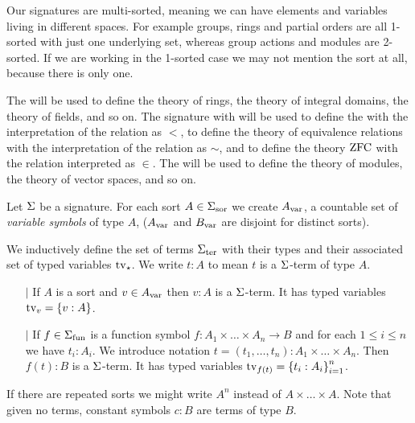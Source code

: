     Our signatures are multi-sorted, meaning we can have elements and 
    variables living in different spaces. 
    For example groups, rings and partial orders are all 1-sorted with just one
    underlying set, whereas group actions and modules are 2-sorted.
    If we are working in the 1-sorted case we may not mention the sort at all,
    because there is only one.
    
\begin{eg}
    The  
    will be used to define the theory of rings, 
    the theory of integral domains, the theory of fields, and so on.
    The signature with 
    will be used to define the 
    with the interpretation of the relation as $<$, 
    to define the theory of equivalence relations with the 
    interpretation of the relation as $\sim$,
    and to define the theory $\operatorname{ZFC}$ with the relation interpreted as $\in$.
    The  %
    will be used to define the theory of modules,
    the theory of vector spaces, and so on.
\end{eg}

\begin{dfn}[$\Si$-terms]
    Let $\Si$ be a signature. 
    For each sort $A \in {\Sigma}_\mathrm{sor}$ we create 
    ${A}_\mathrm{var}$, a countable set of \textit{variable symbols} of type $A$, 
    (${A}_\mathrm{var}$ and ${B}_\mathrm{var}$ are disjoint for distinct sorts).
    
    We inductively define the set of terms
    ${\Sigma}_\mathrm{ter}$ with their types and their 
    associated set of typed variables $\textrm{tv}_{\star}$. 
    We write $t : A$ to mean $t$ is a $\Si$-term of type $A$.
    \begin{itemize}
        \item[$\vert$] If $A$ is a sort and $v \in {A}_\mathrm{var}$ then 
        $v : A$ is a $\Si$-term.
        It has typed variables $\textrm{tv}_{v} = \left\{v : A\right\}$.
        \item[$\vert$] If $f \in {\Sigma}_\mathrm{fun}$ is a function symbol 
            $f : A_1 \times \dots \times A_n \to B$ and for each 
            $1 \leq i \leq n$ we have 
            $t_i : A_i$.
            We introduce notation 
            $t = (t_1,\dots,t_n) : A_1 \times \dots \times A_n$.
            Then $f(t) : B$ is a $\Si$-term.
            It has typed variables $\textrm{tv}_{f(t)} = \left\{t_i : A_i\right\}_{i=1}^n$.
    \end{itemize}
    
    If there are repeated sorts we might write 
    $A^n$ instead of $A \times \dots \times A$.
    Note that given no terms, constant symbols $c : B$ are terms of type $B$.
\end{dfn}

